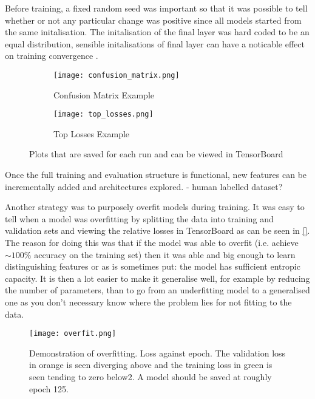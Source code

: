 Before training, a fixed random seed was important so that it was possible to tell whether or not any particular change was positive since all models started
from the same initalisation.  The initalisation of the final layer was hard coded to be an equal distribution, sensible initalisations of final layer can have 
a noticable effect on training convergence \cite{kumar2017weight}.

\begin{figure}[h]
    \centering
    \begin{subfigure}[b]{0.49\textwidth}
        \centering
        \texttt{[image: confusion\_matrix.png]}
        \caption{Confusion Matrix Example}
    \end{subfigure}
    \hfill
    \begin{subfigure}[b]{0.49\textwidth}
        \centering
        \texttt{[image: top\_losses.png]}
        \caption{Top Losses Example}
    \end{subfigure}
\caption{Plots that are saved for each run and can be viewed in TensorBoard}
\label{fig:plots}
\end{figure}

Once the full training and evaluation structure is functional, new features can be incrementally added and architectures explored.
 - human labelled dataset?

Another strategy was to purposely overfit models during training.  It was easy to tell when a model was overfitting by splitting the data into
training and validation sets and viewing the relative losses in TensorBoard as can be seen in \autoref{}.  The reason for doing this
was that if the model was able to overfit (i.e. achieve $\sim100\%$ accuracy on the training set) then it was able and big enough to learn distinguishing features or
as is sometimes put: the model has sufficient entropic capacity.  It is then a lot easier to make it generalise well, for example by reducing the number of parameters, 
than to go from an underfitting model to a generalised one as you don't necessary know where the problem lies for not fitting to the data.

\begin{figure}[h]
    \centering
    \texttt{[image: overfit.png]}
    \caption{Demonstration of overfitting.  Loss against epoch. The validation loss in orange is seen diverging above and the training loss in green is seen tending
    to zero below2.
    A model should be saved at roughly epoch 125.}
    \label{fig:overfit}
\end{figure}

